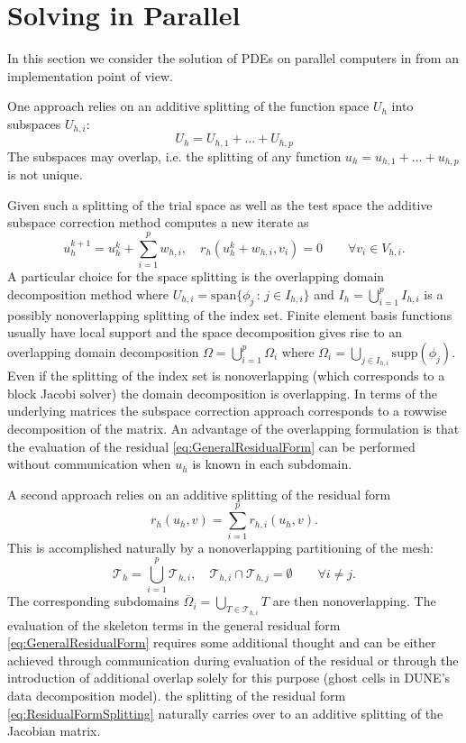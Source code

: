 \documentclass[a4paper,12pt]{article}
\theoremstyle{definition}
\begin{document}
\section{Solving in Parallel}

In this section we consider the solution of PDEs on parallel computers
in from an implementation point of view.

One approach relies on an additive splitting of the function space $U_h$
into subspaces $U_{h,i}$:
\begin{equation}
U_h = U_{h,1} + \ldots  + U_{h,p}
\label{eq:SubspaceSplitting}
\end{equation}
The subspaces may overlap, i.e. the splitting of any function $u_h = u_{h,1} + \ldots + u_{h,p}$
is not unique. 

Given such a splitting of the trial space as well as the test space the additive subspace
correction method \cite{Xu:1992:IMS:146428.146431} computes a new iterate as
\begin{equation*}
u_h^{k+1} = u_h^k + \sum_{i=1}^p w_{h,i}, \quad r_h(u_h^k+w_{h,i},v_i) = 0 \qquad \forall 
v_i\in V_{h,i}.
\end{equation*}
A particular choice for the space splitting is the overlapping domain decomposition
method where $U_{h,i} = \text{span}\{\phi_j\,:\, j\in I_{h,i}\}$ and $I_h = \bigcup_{i=1}^p
I_{h,i}$ is a possibly nonoverlapping splitting of the index set. Finite element basis functions
usually have local support and the space decomposition gives rise to
an overlapping domain decomposition $\Omega = \bigcup_{i=1}^p \Omega_i$ where
$\Omega_i = \bigcup_{j\in I_{h,i}} \text{supp}(\phi_j)$. Even if the splitting of the
index set is nonoverlapping (which corresponds to a block Jacobi solver) the domain
decomposition is overlapping. In terms of the underlying matrices the subspace correction
approach corresponds to a rowwise decomposition of the matrix. 
An advantage of the overlapping formulation is that the evaluation of the 
residual \eqref{eq:GeneralResidualForm} can be performed without
communication when $u_h$ is known in each subdomain.

A second approach relies on an additive splitting of the residual form
\begin{equation}
r_h(u_h,v) = \sum_{i=1}^p r_{h,i}(u_h,v) .
\label{eq:ResidualFormSplitting}
\end{equation}
This is accomplished naturally by a nonoverlapping partitioning of the mesh:
\begin{equation*}
\mathcal{T}_h = \bigcup_{i=1}^p \mathcal{T}_{h,i}, \quad
\mathcal{T}_{h,i}\cap \mathcal{T}_{h,j} = \emptyset \qquad \forall i\neq j.
\end{equation*}
The corresponding subdomains $\overline{\Omega}_i= \bigcup_{T\in\mathcal{T}_{h,i}} T$
are then nonoverlapping. The evaluation of the skeleton terms
in the general residual form \eqref{eq:GeneralResidualForm} requires some additional thought
and can be either achieved through communication during evaluation of the residual 
or through the introduction of additional overlap solely for this purpose (ghost cells
in DUNE's data decomposition model). the splitting of the residual form \eqref{eq:ResidualFormSplitting}
naturally carries over to an additive splitting of the Jacobian matrix.
\end{document}
